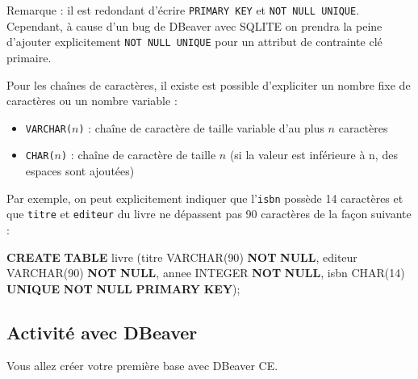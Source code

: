 \documentclass[a4paper,17pt]{extarticle}
\providecommand{\tightlist}{%
      \setlength{\itemsep}{0pt}\setlength{\parskip}{0pt}}
\newenvironment{Shaded}{}{}
\newcommand{\KeywordTok}[1]{\textcolor[rgb]{0.00,0.44,0.13}{\textbf{{#1}}}}
\newcommand{\DataTypeTok}[1]{\textcolor[rgb]{0.56,0.13,0.00}{{#1}}}
\newcommand{\DecValTok}[1]{\textcolor[rgb]{0.25,0.63,0.44}{{#1}}}
\newcommand{\NormalTok}[1]{{#1}}
\begin{document}
    Remarque : il est redondant d'écrire \texttt{PRIMARY\ KEY} et
\texttt{NOT\ NULL\ UNIQUE}. Cependant, à cause d'un bug de DBeaver avec
SQLITE on prendra la peine d'ajouter explicitement
\texttt{NOT\ NULL\ UNIQUE} pour un attribut de contrainte clé primaire.

    Pour les chaînes de caractères, il existe est possible d'expliciter un
nombre fixe de caractères ou un nombre variable :

\begin{itemize}
\tightlist
\item
  \texttt{VARCHAR(}\(n\)\texttt{)} : chaîne de caractère de taille
  variable d'au plus \(n\) caractères
\item
  \texttt{CHAR(}\(n\)\texttt{)} : chaîne de caractère de taille \(n\)
  (si la valeur est inférieure à n, des espaces sont ajoutées)
\end{itemize}

    Par exemple, on peut explicitement indiquer que l'\texttt{isbn} possède
14 caractères et que \texttt{titre} et \texttt{editeur} du livre ne
dépassent pas 90 caractères de la façon suivante :

\begin{Shaded}
\begin{Highlighting}[]
\KeywordTok{CREATE} \KeywordTok{TABLE}\NormalTok{ livre (titre }\DataTypeTok{VARCHAR}\NormalTok{(}\DecValTok{90}\NormalTok{) }\KeywordTok{NOT} \KeywordTok{NULL}\NormalTok{,}
\NormalTok{                    editeur }\DataTypeTok{VARCHAR}\NormalTok{(}\DecValTok{90}\NormalTok{) }\KeywordTok{NOT} \KeywordTok{NULL}\NormalTok{,}
\NormalTok{                    annee }\DataTypeTok{INTEGER} \KeywordTok{NOT} \KeywordTok{NULL}\NormalTok{,}
\NormalTok{                    isbn }\DataTypeTok{CHAR}\NormalTok{(}\DecValTok{14}\NormalTok{) }\KeywordTok{UNIQUE} \KeywordTok{NOT} \KeywordTok{NULL} \KeywordTok{PRIMARY} \KeywordTok{KEY}\NormalTok{);}
\end{Highlighting}
\end{Shaded}

    \hypertarget{activituxe9-avec-dbeaver}{%
\subsection{Activité avec DBeaver}\label{activituxe9-avec-dbeaver}}

    Vous allez créer votre première base avec DBeaver CE.
\end{document}
